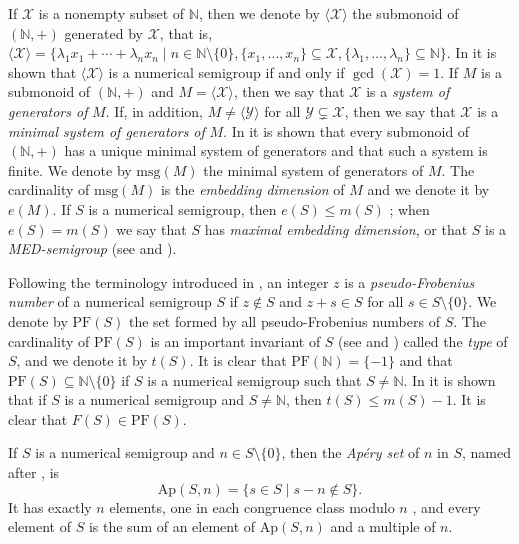 \documentclass[11pt]{article}
\numberwithin{equation}{section}
\newcommand{\Ap}{\mathrm{Ap}}
\newcommand{\msg}{\mathrm{msg}}
\begin{document}
If $\mathcal X$ is a nonempty subset of $\mathbb N$, then we denote by $\langle \mathcal X\rangle$ the submonoid of $(\mathbb N,+)$ generated by $\mathcal X$, that is, $\langle\mathcal X\rangle=\{\lambda_1x_1+\cdots+\lambda_nx_n \mid n\in\mathbb N\setminus\{0\}, \{x_1,\ldots,x_n\}\subseteq\mathcal X,\{\lambda_1,\ldots,\lambda_n\}\subseteq\mathbb N\}$. In \cite[Lemma 2.1]{libro} it is shown that $\langle \mathcal X\rangle$ is a numerical semigroup if and only if $\gcd(\mathcal X)=1$. If $M$ is a submonoid of $(\mathbb N,+)$ and $M=\langle\mathcal X\rangle$, then we say that $\mathcal X$ is a \textit{system of generators of} $M$. If, in addition, $M\ne\langle\mathcal Y\rangle$ for all $\mathcal Y\subsetneq\mathcal X$, then we say that $\mathcal X$ is a \textit{minimal system of generators of} $M$. In \cite[Corollary 2.8]{libro} it is shown that every submonoid of $(\mathbb N,+)$ has a unique minimal system of generators and that such a system is finite. We denote by $\msg(M)$ the minimal system of generators of $M$. The cardinality of $\msg(M)$ is the \textit{embedding dimension} of $M$ and we denote it by $e(M)$. If $S$ is a numerical semigroup, then $e(S)\leq m(S)$ \cite[Proposition 2.10]{libro}; when $e(S)=m(S)$ we say that $S$ has \textit{maximal embedding dimension}, or that $S$ is a \textit{MED-semigroup} (see \cite[Chapter 2]{libro} and \cite{med}).

Following the terminology introduced in \cite{JPAA}, an integer $z$ is a \textit{pseudo-Frobenius number} of a numerical semigroup $S$ if $z\notin S$ and $z+s\in S$ for all $s\in S\setminus\{0\}$. We denote by $\mathrm{PF}(S)$ the set formed by all pseudo-Frobenius numbers of $S$. The cardinality of $\mathrm{PF}(S)$ is an important invariant of $S$ (see \cite{froberg} and \cite{barucci}) called the \textit{type} of $S$, and we denote it by $t(S)$. It is clear that $\mathrm{PF}(\mathbb N)=\{-1\}$ and that $\mathrm{PF}(S)\subseteq\mathbb N\setminus\{0\}$ if $S$ is a numerical semigroup such that $S\ne\mathbb N$. In \cite[Corollary 2.23]{libro} it is shown that if $S$ is a numerical semigroup and $S\ne\mathbb N$, then $t(S)\leq m(S)-1$. It is clear that $F(S)\in\mathrm{PF}(S)$.

If $S$ is a numerical semigroup and $n\in S\setminus\{0\}$, then the \textit{Ap\'ery set} of $n$ in $S$, named after \cite{apery}, is
\[
\Ap(S,n)=\{s\in S\mid s-n\notin S\}.
\]
It has exactly $n$ elements, one in each congruence class modulo $n$ \cite[Lemma 2.4]{libro}, and every element of $S$ is the sum of an element of $\Ap(S,n)$ and a multiple of $n$.
\end{document}
